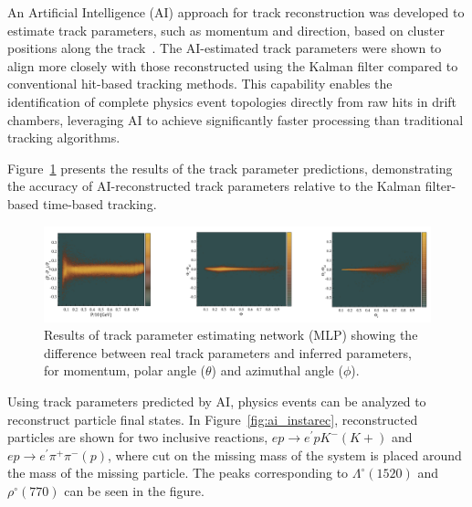 \documentclass[preprint,12pt]{elsarticle}
\begin{document}
An Artificial Intelligence (AI) approach for track reconstruction was developed to estimate track parameters, such as momentum and direction, based on cluster positions along the track~\cite{Thomadakis:2023ebe}. The AI-estimated track parameters were shown to align more closely with those reconstructed using the Kalman filter compared to conventional hit-based tracking methods. This capability enables the identification of complete physics event topologies directly from raw hits in drift chambers, leveraging AI to achieve significantly faster processing than traditional tracking algorithms.

Figure~\ref{fig:ai_inference} presents the results of the track parameter predictions, demonstrating the accuracy of AI-reconstructed track parameters relative to the Kalman filter-based time-based tracking.


\begin{figure}[h!]
\centering
\includegraphics[width=0.85\columnwidth]{images/mlp_track_pars.png}
\caption{Results of track parameter estimating network (MLP) showing the difference between real track parameters and inferred parameters, for momentum, polar angle ($\theta$) and azimuthal angle ($\phi$). } 
\label{fig:ai_inference}
\end{figure}

Using track parameters predicted by AI, physics events can be analyzed to reconstruct particle final states. In Figure~\ref{fig:ai_instarec}, reconstructed particles are shown for two inclusive reactions, $ep\rightarrow e^\prime p K^- (K+)$ and $ep\rightarrow e^\prime\pi^+\pi^-(p)$, where cut on the missing mass of the system is placed around the mass of the missing particle. The peaks corresponding to $\Lambda^\circ (1520)$ and $\rho^\circ (770)$ can be seen in the figure.
\end{document}
